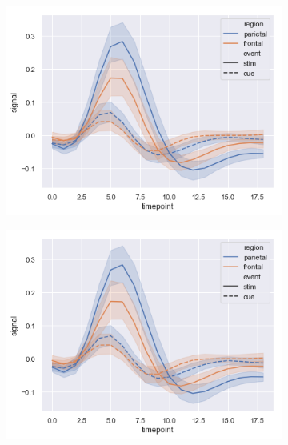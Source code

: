 \begin{figure}[t]
\centering
\begin{subfigure}[b]{0.32\linewidth}
    \includegraphics[width=\textwidth]{images/errorband_lineplots.png}
    \label{fig:subcaption-subfigure1}
\end{subfigure}
\begin{subfigure}[b]{0.32\linewidth}
    \includegraphics[width=\textwidth]{images/errorband_lineplots.png}
    \label{fig:subcaption-subfigure2}
\end{subfigure}
\begin{subfigure}[b]{0.32\linewidth}

\end{subfigure}
\end{figure}
